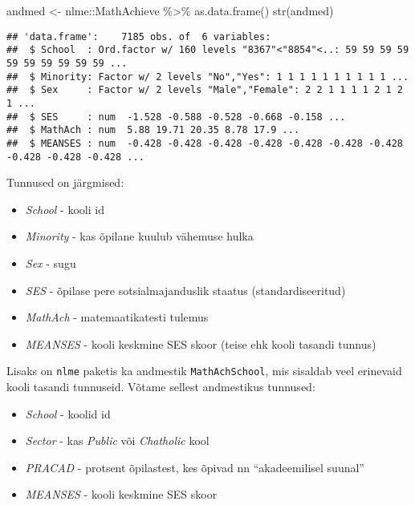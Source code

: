 \documentclass[
]{book}
\newenvironment{Shaded}{\begin{snugshade}}{\end{snugshade}}
\newcommand{\FunctionTok}[1]{\textcolor[rgb]{0.00,0.00,0.00}{#1}}
\newcommand{\NormalTok}[1]{#1}
\newcommand{\OtherTok}[1]{\textcolor[rgb]{0.56,0.35,0.01}{#1}}
\newcommand{\SpecialCharTok}[1]{\textcolor[rgb]{0.00,0.00,0.00}{#1}}
\providecommand{\tightlist}{%
  \setlength{\itemsep}{0pt}\setlength{\parskip}{0pt}}
\begin{document}
\begin{Shaded}
\begin{Highlighting}[]
\NormalTok{andmed }\OtherTok{\textless{}{-}}\NormalTok{ nlme}\SpecialCharTok{::}\NormalTok{MathAchieve }\SpecialCharTok{\%\textgreater{}\%} 
  \FunctionTok{as.data.frame}\NormalTok{()}
\FunctionTok{str}\NormalTok{(andmed)}
\end{Highlighting}
\end{Shaded}

\begin{verbatim}
## 'data.frame':    7185 obs. of  6 variables:
##  $ School  : Ord.factor w/ 160 levels "8367"<"8854"<..: 59 59 59 59 59 59 59 59 59 59 ...
##  $ Minority: Factor w/ 2 levels "No","Yes": 1 1 1 1 1 1 1 1 1 1 ...
##  $ Sex     : Factor w/ 2 levels "Male","Female": 2 2 1 1 1 1 2 1 2 1 ...
##  $ SES     : num  -1.528 -0.588 -0.528 -0.668 -0.158 ...
##  $ MathAch : num  5.88 19.71 20.35 8.78 17.9 ...
##  $ MEANSES : num  -0.428 -0.428 -0.428 -0.428 -0.428 -0.428 -0.428 -0.428 -0.428 -0.428 ...
\end{verbatim}

Tunnused on järgmised:

\begin{itemize}
\tightlist
\item
  \emph{School} - kooli id
\item
  \emph{Minority} - kas õpilane kuulub vähemuse hulka
\item
  \emph{Sex} - sugu
\item
  \emph{SES} - õpilase pere sotsialmajanduslik staatus (standardiseeritud)
\item
  \emph{MathAch} - matemaatikatesti tulemus
\item
  \emph{MEANSES} - kooli keskmine SES skoor (teise ehk kooli tasandi tunnus)
\end{itemize}

Lisaks on \texttt{nlme} paketis ka andmestik \texttt{MathAchSchool}, mis sisaldab veel erinevaid kooli tasandi tunnuseid. Võtame sellest andmestikus tunnused:

\begin{itemize}
\tightlist
\item
  \emph{School} - koolid id
\item
  \emph{Sector} - kas \emph{Public} või \emph{Chatholic} kool
\item
  \emph{PRACAD} - protsent õpilastest, kes õpivad nn ``akadeemilisel suunal''
\item
  \emph{MEANSES} - kooli keskmine SES skoor
\end{itemize}
\end{document}
